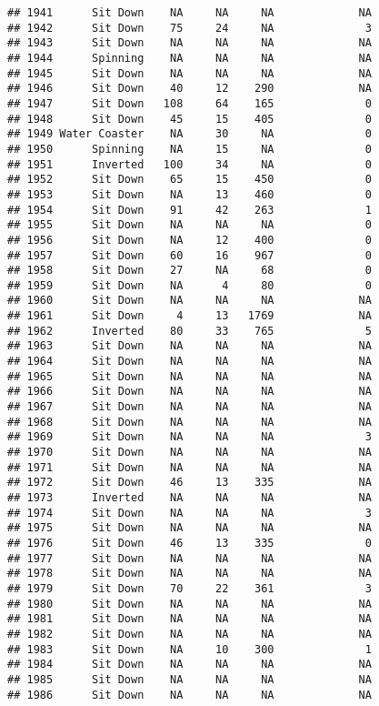 \documentclass[
]{article}
\begin{document}
\begin{verbatim}
## 1941      Sit Down    NA     NA     NA             NA
## 1942      Sit Down    75     24     NA              3
## 1943      Sit Down    NA     NA     NA             NA
## 1944      Spinning    NA     NA     NA             NA
## 1945      Sit Down    NA     NA     NA             NA
## 1946      Sit Down    40     12    290             NA
## 1947      Sit Down   108     64    165              0
## 1948      Sit Down    45     15    405              0
## 1949 Water Coaster    NA     30     NA              0
## 1950      Spinning    NA     15     NA              0
## 1951      Inverted   100     34     NA              0
## 1952      Sit Down    65     15    450              0
## 1953      Sit Down    NA     13    460              0
## 1954      Sit Down    91     42    263              1
## 1955      Sit Down    NA     NA     NA              0
## 1956      Sit Down    NA     12    400              0
## 1957      Sit Down    60     16    967              0
## 1958      Sit Down    27     NA     68              0
## 1959      Sit Down    NA      4     80              0
## 1960      Sit Down    NA     NA     NA             NA
## 1961      Sit Down     4     13   1769             NA
## 1962      Inverted    80     33    765              5
## 1963      Sit Down    NA     NA     NA             NA
## 1964      Sit Down    NA     NA     NA             NA
## 1965      Sit Down    NA     NA     NA             NA
## 1966      Sit Down    NA     NA     NA             NA
## 1967      Sit Down    NA     NA     NA             NA
## 1968      Sit Down    NA     NA     NA             NA
## 1969      Sit Down    NA     NA     NA              3
## 1970      Sit Down    NA     NA     NA             NA
## 1971      Sit Down    NA     NA     NA             NA
## 1972      Sit Down    46     13    335             NA
## 1973      Inverted    NA     NA     NA             NA
## 1974      Sit Down    NA     NA     NA              3
## 1975      Sit Down    NA     NA     NA             NA
## 1976      Sit Down    46     13    335              0
## 1977      Sit Down    NA     NA     NA             NA
## 1978      Sit Down    NA     NA     NA             NA
## 1979      Sit Down    70     22    361              3
## 1980      Sit Down    NA     NA     NA             NA
## 1981      Sit Down    NA     NA     NA             NA
## 1982      Sit Down    NA     NA     NA             NA
## 1983      Sit Down    NA     10    300              1
## 1984      Sit Down    NA     NA     NA             NA
## 1985      Sit Down    NA     NA     NA             NA
## 1986      Sit Down    NA     NA     NA             NA

\end{verbatim}
\end{document}
